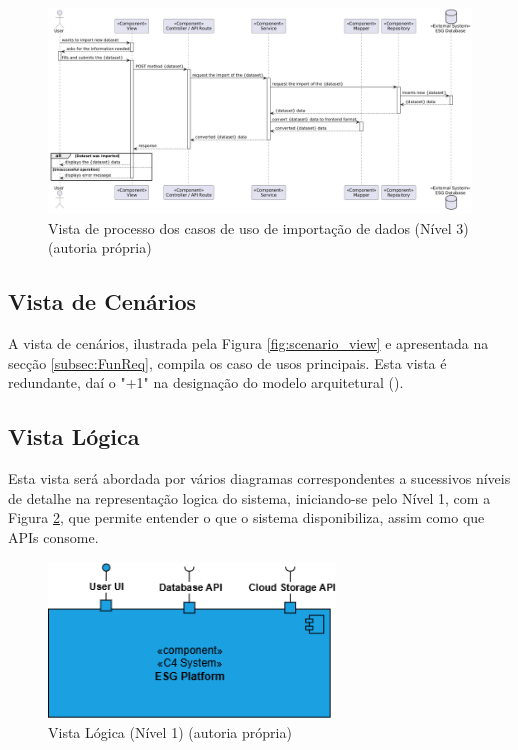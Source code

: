 \begin{figure}[H]
\centering
\includegraphics[width=\linewidth]{frontmatter/assets/diagrams/Process Views/LVL3/uc-07-lvl3.png}
\caption{Vista de processo dos casos de uso de importação de dados (Nível 3) (autoria própria)}
\label{fig:UC7-lvl3}
\end{figure}


\subsection{Vista de Cenários}

A vista de cenários, ilustrada pela Figura \ref{fig:scenario_view} e apresentada na secção \ref{subsec:FunReq}, compila os caso de usos principais. Esta vista é redundante, daí o "+1" na designação do modelo arquitetural (\cite{Kruchten1995}).

\subsection{Vista Lógica}

Esta vista será abordada por vários diagramas correspondentes a sucessivos níveis de detalhe na representação logica do sistema, iniciando-se pelo Nível 1, com a Figura \ref{fig:logical_view_lv1}, que permite entender o que o sistema disponibiliza, assim como que APIs consome.

\begin{figure}[H]
    \centering
    \includegraphics[width=3in,keepaspectratio]{frontmatter/assets/diagrams/Logical View/Logical View Lv1.drawio.png}
    \caption{Vista Lógica (Nível 1) (autoria própria)}
    \label{fig:logical_view_lv1}
\end{figure}


